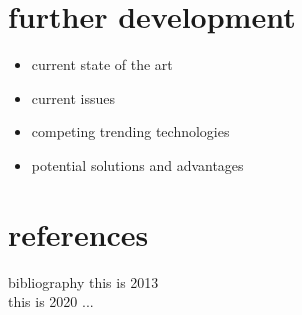 \documentclass[t, aspectratio=169]{beamer}
\begin{document}


\section{further development}
\begin{frame}[c]
	\centering\LARGE\textbf{\secname}
\end{frame}


\begin{frame}{\secname}
	\begin{itemize}
		\item current state of the art
		\item current issues
		\item competing trending technologies
		\item potential solutions and advantages
	\end{itemize}
	\vspace{1 cm}
\end{frame}


\section{references}
\begin{frame}[c]
	\centering\LARGE\textbf{\secname}
\end{frame}


\begin{frame}{bibliography}
this is 2013 \cite{Kim2013} \\
this is 2020 ... 

%
%
\end{frame}


\frame{}

\end{document}
